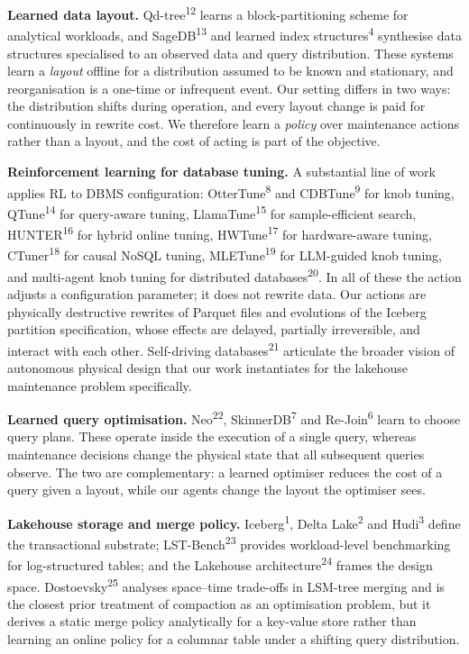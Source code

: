 \documentclass[fleqn,10pt]{wlscirep}
\begin{document}
\textbf{Learned data layout.}
Qd-tree\textsuperscript{12} learns a block-partitioning scheme for
analytical workloads, and SageDB\textsuperscript{13} and learned index
structures\textsuperscript{4} synthesise data structures specialised to
an observed data and query distribution. These systems learn a
\emph{layout} offline for a distribution assumed to be known and
stationary, and reorganisation is a one-time or infrequent event. Our
setting differs in two ways: the distribution shifts during operation,
and every layout change is paid for continuously in rewrite cost. We
therefore learn a \emph{policy} over maintenance actions rather than a
layout, and the cost of acting is part of the objective.

\textbf{Reinforcement learning for database tuning.}
A substantial line of work applies RL to DBMS configuration:
OtterTune\textsuperscript{8} and CDBTune\textsuperscript{9} for knob
tuning, QTune\textsuperscript{14} for query-aware tuning,
LlamaTune\textsuperscript{15} for sample-efficient search,
HUNTER\textsuperscript{16} for hybrid online tuning,
HWTune\textsuperscript{17} for hardware-aware tuning,
CTuner\textsuperscript{18} for causal NoSQL tuning,
MLETune\textsuperscript{19} for LLM-guided knob tuning, and
multi-agent knob tuning for distributed
databases\textsuperscript{20}. In all of these the action adjusts a
configuration parameter; it does not rewrite data. Our actions are
physically destructive rewrites of Parquet files and evolutions of the
Iceberg partition specification, whose effects are delayed, partially
irreversible, and interact with each other. Self-driving
databases\textsuperscript{21} articulate the broader vision of
autonomous physical design that our work instantiates for the lakehouse
maintenance problem specifically.

\textbf{Learned query optimisation.}
Neo\textsuperscript{22}, SkinnerDB\textsuperscript{7} and
Re-Join\textsuperscript{6} learn to choose query plans. These operate
inside the execution of a single query, whereas maintenance decisions
change the physical state that all subsequent queries observe. The two
are complementary: a learned optimiser reduces the cost of a query given
a layout, while our agents change the layout the optimiser sees.

\textbf{Lakehouse storage and merge policy.}
Iceberg\textsuperscript{1}, Delta Lake\textsuperscript{2} and
Hudi\textsuperscript{3} define the transactional substrate;
LST-Bench\textsuperscript{23} provides workload-level benchmarking for
log-structured tables; and the Lakehouse
architecture\textsuperscript{24} frames the design space.
Dostoevsky\textsuperscript{25} analyses space--time trade-offs in
LSM-tree merging and is the closest prior treatment of compaction as an
optimisation problem, but it derives a static merge policy analytically
for a key-value store rather than learning an online policy for a
columnar table under a shifting query distribution.
\end{document}
